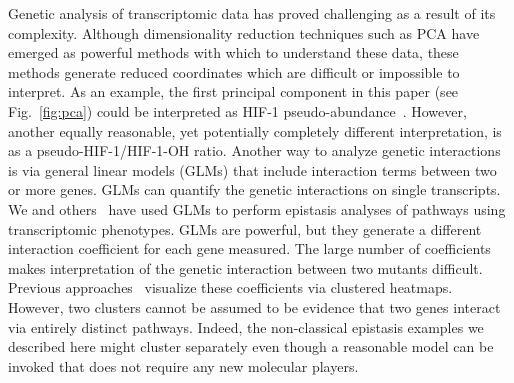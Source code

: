 \documentclass[9pt,twocolumn,twoside]{pnas-new}
\newcommand{\hifp}{HIF-1}
\begin{document}
%
%

Genetic analysis of transcriptomic data has proved challenging as a result of
its complexity. Although dimensionality reduction techniques such as PCA have
emerged as powerful methods with which to understand these data, these methods
generate reduced coordinates which are difficult or impossible to interpret. As
an example, the first principal component in this paper (see Fig.~\ref{fig:pca})
could be interpreted as \hifp{} pseudo-abundance~\cite{Lonnberg2017}. However,
another equally reasonable, yet potentially completely different interpretation,
is as a pseudo-\hifp{}/\hifp{}-OH ratio.
Another way to analyze genetic interactions is via general linear models (GLMs)
that include interaction terms between two or more genes. GLMs can quantify the
genetic interactions on single transcripts. We and others~\cite{Dixit2016,
Angeles-Albores2017a} have used GLMs to perform epistasis analyses of
pathways using transcriptomic phenotypes. GLMs are powerful, but
they generate a different interaction coefficient for each gene measured. The
large number of coefficients makes interpretation of the genetic interaction
between two mutants  difficult. Previous approaches~\cite{Dixit2016}
visualize these coefficients via clustered heatmaps. However, two clusters
cannot be assumed to be evidence that two genes interact via entirely distinct
pathways. Indeed, the non-classical epistasis examples we described here might
cluster separately even though a reasonable model can be invoked that does not
require any new molecular players.
\color{black}
\end{document}
